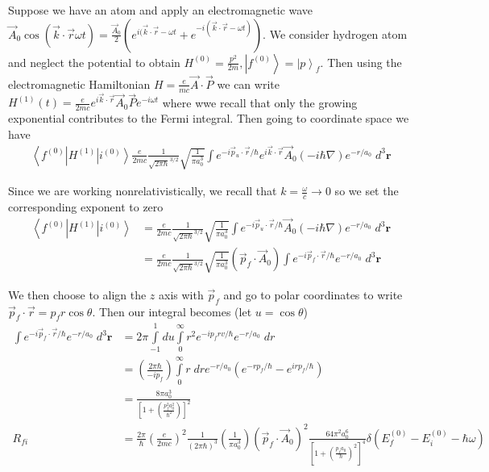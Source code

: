 \documentclass[10pt]{report}
\newcommand{\bra}[1]{\left<#1\right|}
\newcommand{\ket}[1]{\left|#1\right>}
\begin{document}
Suppose we have an atom and apply an electromagnetic wave $\vec{A}_0 \cos(\vec{k}\cdot \vec{r}  \omega t) = \frac{\vec{A}_0}{2}\left( e^{i(\vec{k}\cdot \vec{r} - \omega t} + e^{-i\left( \vec{k}\cdot \vec{r} - \omega t \right)} \right)$. We consider hydrogen atom and neglect the potential to obtain $H^{(0)} = \frac{p^2}{2m}, \ket{f^{(0)}} = \ket{p}_f$. Then using the electromagnetic Hamiltonian $H = \frac{e}{mc}\vec{A}\cdot \vec{P}$ we can write $H^{(1)}(t) = \frac{e}{2mc}e^{i\vec{k}\cdot \vec{r}}\vec{A}_0 \vec{P}e^{-i\omega t}$ where wwe recall that only the growing exponential contributes to the Fermi integral. Then going to coordinate space we have
\begin{align}
    \bra{f^{(0)}}H^{(1)}\ket{i^{(0)}}\frac{e}{2mc}\frac{1}{\sqrt{2\pi\hbar}^{3/2}}\sqrt{\frac{1}{\pi a_0^3}}\displaystyle\int\limits_{}^{}e^{-i\vec{p}_u\cdot \vec{r}/\hbar}e^{i\vec{k}\cdot \vec{r}}\vec{A}_0(-i\hbar\nabla)e^{-r/a_0}\;d^3\mathbf{r}
\end{align}

Since we are working nonrelativistically, we recall that $k = \frac{\omega}{c} \to 0$ so we set the corresponding exponent to zero
\begin{align}
    \bra{f^{(0)}}H^{(1)}\ket{i^{(0)}} &= \frac{e}{2mc}\frac{1}{\sqrt{2\pi\hbar}^{3/2}}\sqrt{\frac{1}{\pi a_0^3}}\displaystyle\int\limits_{}^{}e^{-i\vec{p}_u\cdot \vec{r}/\hbar}\vec{A}_0(-i\hbar\nabla)e^{-r/a_0}\;d^3\mathbf{r}\\
    &= \frac{e}{2mc}\frac{1}{\sqrt{2\pi\hbar}^{3/2}}\sqrt{\frac{1}{\pi a_0^3}}(\vec{p}_f \cdot \vec{A}_0)\int e^{-i\vec{p}_f\cdot \vec{r}/\hbar}e^{-r/a_0}\;d^3\mathbf{r}
\end{align}

We then choose to align the $z$ axis with $\vec{p}_f$ and go to polar coordinates to write $\vec{p}_f\cdot \vec{r} = p_f r \cos \theta$. Then our integral becomes (let $u = \cos \theta$)
\begin{align}
    \int e^{-i\vec{p}_f\cdot \vec{r}/\hbar}e^{-r/a_0}\;d^3\mathbf{r}&= 2\pi\displaystyle\int\limits_{-1}^{1}du\displaystyle\int\limits_{0}^{\infty}r^2 e^{-ip_frv/\hbar}e^{-r/a_0}\;dr\\
    &= \left( \frac{2\pi \hbar}{-ip_f} \right)\displaystyle\int\limits_{0}^{\infty}r\;dre^{-r/a_0}\left( e^{-rp_f/\hbar} - e^{irp_f/\hbar} \right)\\
    &= \frac{8\pi a_0^3}{\left[ 1+\left( \frac{p_f^2a_0^2}{\hbar^2} \right) \right]^2}\\
    R_{fi} &= \frac{2\pi}{\hbar}\left( \frac{e}{2mc} \right)^2\frac{1}{(2\pi \hbar)^3}\left( \frac{1}{\pi a_0^3} \right)\left( \vec{p}_f\cdot \vec{A}_0 \right)^2\frac{64\pi^2 a_0^6}{\left[ 1 + \left(\frac{p_fa_0}{\hbar}\right)^2 \right]^4}\delta\left( E_f^{(0)} - E_i^{(0)} - \hbar\omega \right)
\end{align}
\end{document}
